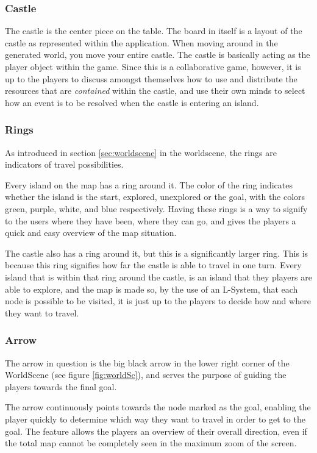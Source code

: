 \subsubsection{Castle}
The castle is the center piece on the table. The board in itself is a layout of the castle as represented within the application.
When moving around in the generated world, you move your entire castle. The castle is basically acting as the player object within the game. Since this is a collaborative game, however, it is up to the players to discuss amongst themselves how to use and distribute the resources that are \textit{contained} within the castle, and use their own minds to select how an event is to be resolved when the castle is entering an island.

\subsubsection{Rings}
As introduced in section \ref{sec:worldscene} in the worldscene, the rings are indicators of travel possibilities.

Every island on the map has a ring around it. The color of the ring indicates whether the island is the start, explored, unexplored or the goal, with the colors green, purple, white, and blue respectively. Having these rings is a way to signify to the users where they have been, where they can go, and gives the players a quick and easy overview of the map situation.

The castle also has a ring around it, but this is a significantly larger ring. This is because this ring signifies how far the castle is able to travel in one turn. Every island that is within that ring around the castle, is an island that they players are able to explore, and the map is made so, by the use of an L-System, that each node is possible to be visited, it is just up to the players to decide how and where they want to travel.

\subsubsection{Arrow}
The arrow in question is the big black arrow in the lower right corner of the WorldScene (see figure \ref{fig:worldSc}), and serves the purpose of guiding the players towards the final goal.

The arrow continuously points towards the node marked as the goal, enabling the player quickly to determine which way they want to travel in order to get to the goal. 
The feature allows the players an overview of their overall direction, even if the total map cannot be completely seen in the maximum zoom of the screen. 

